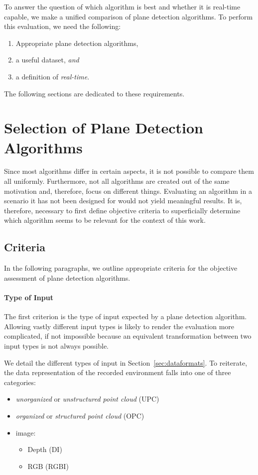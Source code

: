 \documentclass[main.tex]{subfiles}
\begin{document}
To answer the question of which algorithm is best and whether it is real-time capable, we make a unified comparison of plane detection algorithms.
To perform this evaluation, we need the following:

\begin{enumerate}
    \item \label{enum:pda}Appropriate plane detection algorithms,
    \item \label{enum:ds} a useful dataset, \textit{and}
    \item \label{enum:rt} a definition of \textit{real-time}.
\end{enumerate}
The following sections are dedicated to these requirements.

\section{Selection of Plane Detection Algorithms}\label{sec:pdaselection}

Since most algorithms differ in certain aspects, it is not possible to compare them all uniformly.
Furthermore, not all algorithms are created out of the same motivation and, therefore, focus on different things.
Evaluating an algorithm in a scenario it has not been designed for would not yield meaningful results.
It is, therefore, necessary to first define objective criteria to superficially determine which algorithm seems to be relevant
for the context of this work.


\subsection{Criteria}
In the following paragraphs, we outline appropriate criteria for the objective assessment of plane detection algorithms.

\paragraph{Type of Input}\label{par:input}
The first criterion is the type of input expected by a plane detection algorithm.
Allowing vastly different input types is likely to render the evaluation more complicated, if not impossible because an equivalent transformation
between two input types is not always possible.

We detail the different types of input in Section~\ref{sec:dataformats}. To reiterate, the data representation of the recorded
environment falls into one of three categories:
\begin{itemize}
    \item \textit{unorganized} or \textit{unstructured point cloud} (UPC)
    \item \textit{organized} or \textit{structured point cloud} (OPC)
    \item image:
          \begin{itemize}
              \item Depth (DI)
              \item RGB (RGBI)
          \end{itemize}
\end{itemize}
\end{document}

